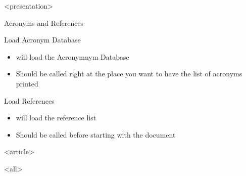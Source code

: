 \mode
<presentation>

\begin{frame}{Acronyms and References}
  \label{manual:acrbib}

  Load Acronym Database
  \begin{itemize}
    \item \cmd{\skbacronyms} will load the Acronymnym Database
    \item Should be called right at the place you want to have the list of acronyms printed
  \end{itemize}

  \bigskip

  Load References
  \begin{itemize}
    \item \cmd{\skbbibtex} will load the reference list
    \item Should be called before starting with the document
  \end{itemize}

\end{frame}


\mode
<article>

\bigskip


\clearpage

\mode
<all>
